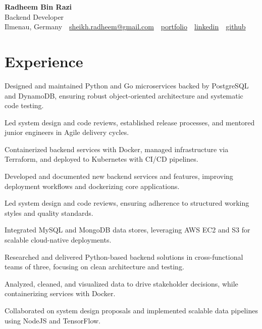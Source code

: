 \documentclass[11pt,a4paper]{resume}
\makeatletter
\newcommand{\Portfolio}{https://radheem.github.io/my-cv}
\newcommand{\PortfolioText}{portfolio}
\newcommand{\GitHub}{https://github.com/radheem}
\newcommand{\LinkedIn}{https://www.linkedin.com/in/radheem-razi}
\newcommand{\Email}{sheikh.radheem@gmail.com}
\makeatother
\begin{document}
\begin{center}
  {\huge\bfseries Radheem Bin Razi}\\[3pt]
  {\large Backend Developer}\\[6pt]
  \small
  Ilmenau, Germany \,\textbar\,
  \href{mailto:\Email}{\Email} \,\textbar\,
  \href{\Portfolio}{\PortfolioText} \,\textbar\,
  \href{\LinkedIn}{linkedin} \,\textbar\,
  \href{\GitHub}{github}
\end{center}
\vspace{2pt}

\section{Experience}

\bullets
  \item Designed and maintained Python and Go microservices backed by PostgreSQL and DynamoDB, ensuring robust object-oriented architecture and systematic code testing.
  \item Led system design and code reviews, established release processes, and mentored junior engineers in Agile delivery cycles.
  \item Containerized backend services with Docker, managed infrastructure via Terraform, and deployed to Kubernetes with CI/CD pipelines.
\bulletsend
\vspace{3pt}
\bullets
  \item Developed and documented new backend services and features, improving deployment workflows and dockerizing core applications.
  \item Led system design and code reviews, ensuring adherence to structured working styles and quality standards.
  \item Integrated MySQL and MongoDB data stores, leveraging AWS EC2 and S3 for scalable cloud-native deployments.
\bulletsend
\vspace{3pt}
\bullets
  \item Researched and delivered Python-based backend solutions in cross-functional teams of three, focusing on clean architecture and testing.
  \item Analyzed, cleaned, and visualized data to drive stakeholder decisions, while containerizing services with Docker.
  \item Collaborated on system design proposals and implemented scalable data pipelines using NodeJS and TensorFlow.
\bulletsend
\vspace{3pt}
\end{document}
